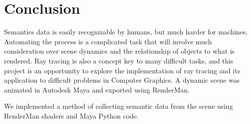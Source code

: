 \documentclass[conference]{IEEEtran}
\begin{document}
\section{Conclusion}
\label{sec:conclusion}
Semantics data is easily recognizable by humans, but much harder for machines.
Automating the process is a complicated task that will involve much consideration over
scene dynamics and the relationship of objects to what is rendered.
Ray tracing is also a concept
key to many difficult tasks, and this project is an
opportunity to explore the implementation of ray tracing and its application
to difficult problems in Computer Graphics.
A dynamic scene was animated in Autodesk Maya and exported
using RenderMan.

We implemented a method of collecting semantic data from the scene using
RenderMan shaders and Maya Python code.



\onecolumn
\end{document}
